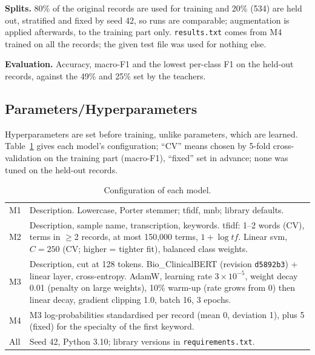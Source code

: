 \documentclass[twocolumn,10pt]{article}
\begin{document}
\textbf{Splits.} 80\% of the original records are used for training and 20\% (534) are held out, stratified and fixed by seed 42, so runs are comparable; augmentation is applied afterwards, to the training part only. \texttt{results.txt} comes from M4 trained on all the records; the given test file was used for nothing else.

\textbf{Evaluation.} Accuracy, macro-F1 and the lowest per-class F1 on the held-out records, against the 49\% and 25\% set by the teachers.

\subsection{Parameters/Hyperparameters}

Hyperparameters are set before training, unlike parameters, which are learned. Table~\ref{tab:hyper} gives each model's configuration; ``CV'' means chosen by 5-fold cross-validation on the training part (macro-F1), ``fixed'' set in advance; none was tuned on the held-out records.

\begin{table}[!ht]
\centering
\caption{Configuration of each model.}
\label{tab:hyper}
\footnotesize
\setlength{\tabcolsep}{3pt}
\begin{tabular}{@{}l@{\hspace{4pt}}p{6.65cm}@{}}
\toprule
M1 & Description. Lowercase, Porter stemmer; \ac{tfidf}, \ac{mnb}; library defaults. \\
M2 & Description, sample name, transcription, keywords. \ac{tfidf}: 1--2 words (CV), terms in $\geq$2 records, at most 150{,}000 terms, $1+\log tf$. Linear \ac{svm}, $C=250$ (CV; higher = tighter fit), balanced class weights. \\
M3 & Description, cut at 128 tokens. Bio\_ClinicalBERT (revision \texttt{d5892b3}) + linear layer, cross-entropy. AdamW, learning rate $3\!\times\!10^{-5}$, weight decay 0.01 (penalty on large weights), 10\% warm-up (rate grows from 0) then linear decay, gradient clipping 1.0, batch 16, 3 epochs. \\
M4 & M3 log-probabilities standardised per record (mean 0, deviation 1), plus 5 (fixed) for the specialty of the first keyword. \\
All & Seed 42, Python 3.10; library versions in \texttt{requirements.txt}. \\
\bottomrule
\end{tabular}
\end{table}
\end{document}
